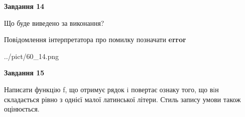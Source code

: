 \documentclass[11pt, ukrainian]{article}
\begin{document}
{\begin {large}
{\begin {center}\textbf{Завдання 14}\end {center}}\par
Що буде виведено за виконання? \par
Повідомлення інтерпретатора про помилку позначати \textbf{error}

\begin{center}
	{../pict/60_14.png}
\end{center}
\newpage

{\begin {center}\textbf{Завдання 15}\end {center}}\par

Написати функцiю f, що отримує рядок i повертає ознаку того, що вiн складається рівно з однієї малої латинської літери. Стиль запису умови також оцінюється.\par
\newpage

\end {large}}
\end{document}
